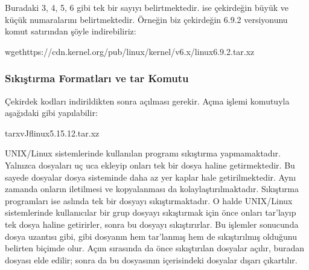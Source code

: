 \documentclass[a4paper,10pt,turkish]{sphinxmanual}
\begin{document}
\sphinxAtStartPar
Buradaki  3, 4, 5, 6 gibi tek bir sayıyı belirtmektedir.  ise çekirdeğin
büyük ve küçük numaralarını belirtmektedir. Örneğin biz çekirdeğin 6.9.2 versiyonunu komut satırından
şöyle indirebiliriz:

\begin{sphinxVerbatim}[commandchars=\\\{\}]
\PYGZdl{}wgethttps://cdn.kernel.org/pub/linux/kernel/v6.x/linux\PYGZhy{}6.9.2.tar.xz
\end{sphinxVerbatim}


\subsubsection{Sıkıştırma Formatları ve tar Komutu}
\label{\detokenize{kernelcompilation:sikistirma-formatlari-ve-tar-komutu}}
\sphinxAtStartPar
Çekirdek kodları indirildikten sonra açılması gerekir. Açma işlemi  komutuyla aşağıdaki gibi
yapılabilir:

\begin{sphinxVerbatim}[commandchars=\\\{\}]
\PYGZdl{}tar\PYGZhy{}xvJflinux\PYGZhy{}5.15.12.tar.xz
\end{sphinxVerbatim}

\sphinxAtStartPar
UNIX/Linux sistemlerinde kullanılan  programı sıkıştırma yapmamaktadır. Yalnızca dosyaları uç uca
ekleyip onları tek bir dosya haline getirmektedir. Bu sayede dosyalar dosya sisteminde daha az yer
kaplar hale getirilmektedir. Aynı zamanda onların iletilmesi ve kopyalanması da kolaylaştırılmaktadır.
Sıkıştırma programları ise aslında tek bir dosyayı sıkıştırmaktadır. O halde UNIX/Linux sistemlerinde
kullanıcılar bir grup dosyayı sıkıştırmak için önce onları tar’layıp tek dosya haline getirirler, sonra
bu dosyayı sıkıştırırlar. Bu işlemler sonucunda dosya uzantısı  gibi,  gibi
dosyanın hem tar’lanmış hem de sıkıştırılmış olduğunu belirten biçimde olur. Açım sırasında da önce
sıkıştırılan dosyalar açılır, buradan  dosyası elde edilir; sonra da bu  dosyasının
içerisindeki dosyalar dışarı çıkartılır.
\end{document}
